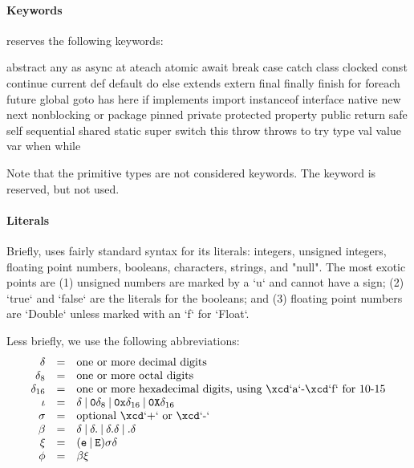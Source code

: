 \paragraph{Keywords}
\Xten{} reserves the following keywords:
\begin{xten}
abstract        any             as              async
at              ateach          atomic          await
break           case            catch           class
clocked         const           continue        current
def             default         do              else
extends         extern          final           finally
finish          for             foreach         future
global
goto            has             here            if             
implements      import          instanceof      interface
native          new             next            nonblocking     
or              package         pinned          private        
protected       property        public          return
safe            self            sequential      shared
static
super           switch          this            throw
throws          to              try             type
val             value           var             when
while
\end{xten}
Note that the primitive types are not considered keywords.
The keyword  is reserved, but not used.

\paragraph{Literals}\label{Literals}

Briefly, \XtenCurrVer{} uses fairly standard syntax for its literals:
integers, unsigned integers, floating point numbers, booleans, 
characters, strings, and \xcd"null".  The most exotic points are (1) unsigned
numbers are marked by a \xcd`u` and cannot have a sign; (2) \xcd`true` and
\xcd`false` are the literals for the booleans; and (3) floating point numbers
are \xcd`Double` unless marked with an \xcd`f` for \xcd`Float`. 

Less briefly, we use the following abbreviations: 
\begin{displaymath}
\begin{array}{rcll}
\delta &=& \mbox{one or more decimal digits}\\
\delta_8 &=& \mbox{one or more octal digits}\\
\delta_{16} &=& \mbox{one or more hexadecimal digits, using \xcd`a`-\xcd`f`
for 10-15}\\
\iota &=& \delta 
        \mathbin{|} {\tt 0} \delta_8 
        \mathbin{|} {\tt 0x} \delta_{16}
        \mathbin{|} {\tt 0X} \delta_{16}
\\
\sigma &=& \mbox{optional \xcd`+` or \xcd`-`}\\
\beta &=& \delta 
          \mathbin{|} \delta {\tt .}
          \mathbin{|} \delta {\tt .} \delta
          \mathbin{|}  {\tt .} \delta \\
\xi &=& ({\tt e } \mathbin{|} {\tt E})
         \sigma
         \delta \\
\phi &=& \beta \xi
\end{array}
\end{displaymath}


